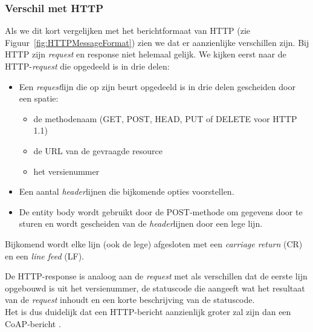 \newpage

\subsubsection{Verschil met HTTP}

Als we dit kort vergelijken met het berichtformaat van HTTP (zie Figuur~\ref{fig:HTTPMessageFormat}) zien we dat er aanzienlijke verschillen zijn. Bij HTTP zijn \textit{request} en response niet helemaal gelijk. We kijken eerst naar de HTTP-\textit{request} die opgedeeld is in drie delen:
\begin{itemize}
\item Een \textit{request}lijn die op zijn beurt opgedeeld is in drie delen gescheiden door een spatie:
\begin{itemize}
\item de methodenaam (GET, POST, HEAD, PUT of DELETE voor HTTP 1.1)
\item de URL van de gevraagde resource
\item het versienummer
\end{itemize}
\item Een aantal \textit{header}lijnen die bijkomende opties voorstellen.
\item De entity body wordt gebruikt door de POST-methode om gegevens door te sturen en wordt gescheiden van de \textit{header}lijnen door een lege lijn. 
\end{itemize}
Bijkomend wordt elke lijn (ook de lege) afgesloten met een \textit{carriage return} (CR) en een \textit{line feed} (LF).

De HTTP-response is analoog aan de \textit{request} met als verschillen dat de eerste lijn opgebouwd is uit het versienummer, de statuscode die aangeeft wat het resultaat van de \textit{request} inhoudt en een korte beschrijving van de statuscode.\\
Het is dus duidelijk dat een HTTP-bericht aanzienlijk groter zal zijn dan een CoAP-bericht \cite{vergelijkingHTTP}.

